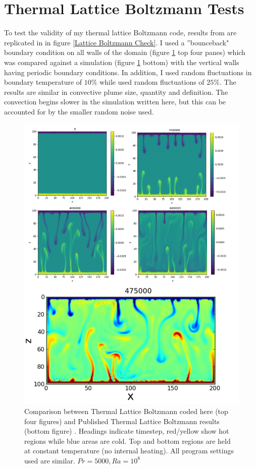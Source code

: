 \documentclass{article}
\begin{document}
\section*{Thermal Lattice Boltzmann Tests}
To test the validity of my thermal lattice Boltzmann code, results from  \cite{mora2017simulation} are replicated in in figure \ref{Lattice Boltzmann 
Check}. I used a ''bounceback" boundary condition on all walls of the domain (figure \ref{Lattice Boltzmann Check} top four panes) which was compared 
against a simulation (figure \ref{Lattice Boltzmann Check} bottom) with the vertical walls having periodic boundary conditions. In addition, I used 
random fluctuations in boundary temperature of $10 \%$ while \cite{mora2017simulation} used random fluctuations of $25 \%$. The results are similar in 
convective plume size, quantity and definition. The convection begins slower in the simulation written here, but this can be accounted for by the smaller 
random noise used.


\begin{figure}[H]
	\centering
	\includegraphics[scale=1.4]{latticeboltzmancheck.png}
	\caption{ Comparison between Thermal Lattice Boltzmann coded here (top four figures) and Published Thermal Lattice Boltzmann results (bottom figure) \cite{mora2017simulation}. Headings indicate timestep, red/yellow show hot regions while blue areas are cold. Top and bottom regions are held at constant temperature (no internal heating). All program settings used are similar. $Pr=5000, Ra=10^8$}
	\label{Lattice Boltzmann Check}
\end{figure}
\end{document}

